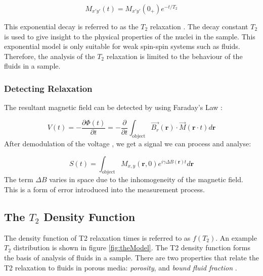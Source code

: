 \begin{equation}
    M_{x'y'}(t) = M_{x'y'}(0_+) e^{-t/T_2}
    \label{eq:T2ExpoenetialRelaxation}
\end{equation}

This exponential decay is referred to as the $T_2$ relaxation  \cite{NMRSignalProcessingBook}. The decay constant $T_2$ is used to give insight to the physical properties of the nuclei in the sample. This exponential model is only suitable for weak spin-spin systems such as fluids. Therefore, the analysis of the $T_2$ relaxation is limited to the behaviour of the fluids in a sample.

\subsubsection{Detecting Relaxation}
The resultant magnetic field can be detected by using Faraday's Law \cite{NMRSignalProcessingBook}:

\begin{equation}
    V(t) = -\frac{\partial \Phi(t)}{\partial t} = - \frac{\partial}{\partial t} \int_\text{object} \vec{B_r}(\bm{r}) \cdot \vec{M}(\bm{r} \cdot t) d \bm{r}
    \label{eq:detectionFaraday}
\end{equation}
After demodulation of the voltage \cite{NMRSignalProcessingBook}, we get a signal we can process and analyse:

\begin{equation}
    S(t) = \int_{\text{object}} M_{x,y}(\bm{r}, 0 )e^{i\gamma \Delta B(\bm{r})t} d \bm{r}
    \label{eq:detectionFinalSignal}
\end{equation}
The term $\Delta B $ varies in space due to the inhomogeneity of the magnetic field. This is a form of error introduced into the measurement process.

\subsection{The $T_2$ Density Function}
The density function of T2 relaxation times is referred to as $f(T_2)$. An example $T_2$ distribution is shown in figure \ref{fig:theModel}. The T2 density function forms the basis of analysis of fluids in a sample. There are two properties that relate the T2 relaxation to fluids in porous media: \textit{porosity}, and \textit{bound fluid fraction} \cite{NMRForRockskleinberg1993nuclear} \cite{wellLoggingBook}.

